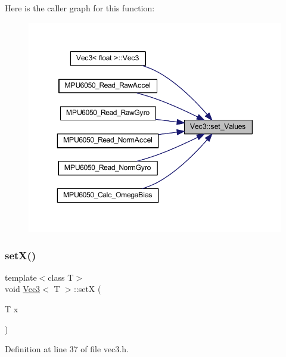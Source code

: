 Here is the caller graph for this function\+:
\nopagebreak
\begin{figure}[H]
\begin{center}
\leavevmode
\includegraphics[width=350pt]{class_vec3_ae581dad3aa1a885da7538582a3324d3a_icgraph}
\end{center}
\end{figure}
\mbox{\label{class_vec3_a2d66e34e1ad4be888821158541fcd2ea}} 
\subsubsection{\texorpdfstring{setX()}{setX()}}
{\footnotesize\ttfamily template$<$class T$>$ \\
void \mbox{\hyperlink{class_vec3}{Vec3}}$<$ T $>$\+::setX (\begin{DoxyParamCaption}\item[{T}]{x }\end{DoxyParamCaption})\hspace{0.3cm}{\ttfamily [inline]}}



Definition at line 37 of file vec3.\+h.

